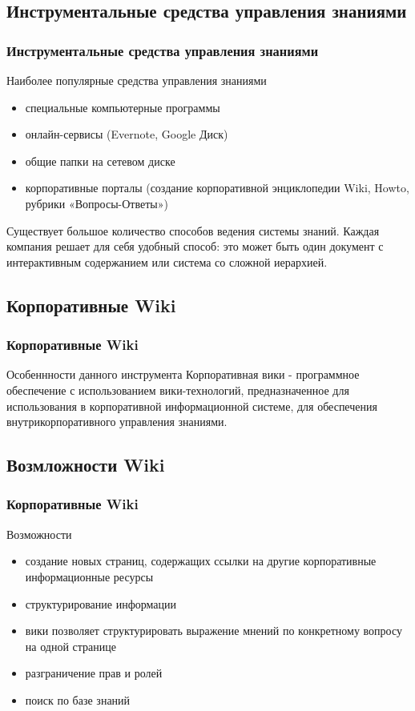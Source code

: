 \documentclass{industrial-development}
\begin{document}
\subsection{Инструментальные средства управления знаниями}
\begin{frame} \frametitle{Инструментальные средства управления знаниями}
  \begin{block}{Наиболее популярные средства управления знаниями}
  \end{block}
  
  \begin{itemize}
  \item специальные компьютерные программы
  \item онлайн-сервисы (Evernote, Google Диск)
  \item общие папки на сетевом диске
  \item корпоративные порталы (создание корпоративной энциклопедии Wiki, Howto, рубрики «Вопросы-Ответы»)
  \end{itemize}
\end{frame}

\lecturenotes
 Существует большое количество способов ведения системы знаний. Каждая компания решает для себя удобный способ: это может быть один документ с интерактивным содержанием или система со сложной иерархией.

\subsection{Корпоративные Wiki}
\begin{frame} \frametitle{Корпоративные Wiki}
  \begin{block}{Особеннности данного инструмента}
 Корпоративная вики - программное обеспечение с использованием вики-технологий, предназначенное для использования в корпоративной информационной системе, для обеспечения внутрикорпоративного управления знаниями.
  \end{block}
\end{frame}

\subsection{Возмложности Wiki}
\begin{frame} \frametitle{Корпоративные Wiki}
  \begin{block}{Возможности}
   \end{block}
  
  \begin{itemize}
  \item создание новых страниц, содержащих ссылки на другие корпоративные информационные ресурсы
  \item структурирование информации 
  \item вики позволяет структурировать выражение мнений по конкретному вопросу на одной странице
  \item разграничение прав и ролей
  \item поиск по базе знаний
  \end{itemize}
\end{frame}
\end{document}
